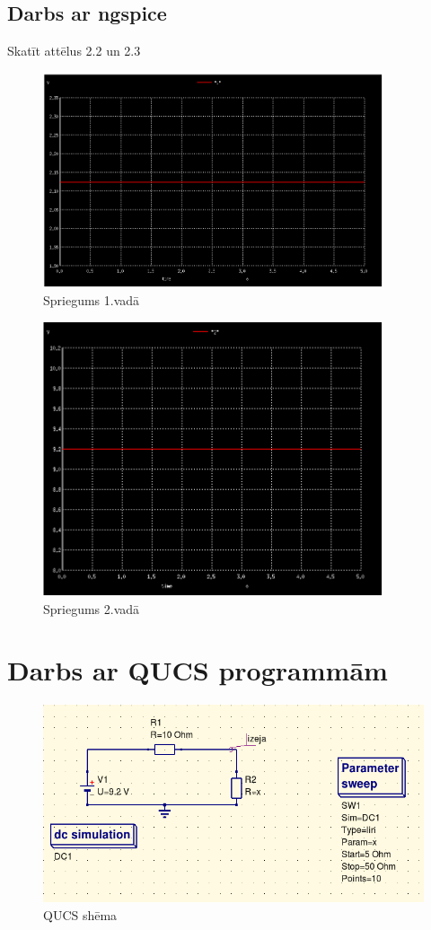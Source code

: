 \documentclass{report}
\begin{document}
\subsection{Darbs ar ngspice}
Skatīt attēlus 2.2 un 2.3 
\begin{figure}[!h]
    \centering
    \includegraphics[width=10cm]{011.png}
    \caption{Spriegums 1.vadā}
    \label{fig:2.1}
    \end{figure}
 \begin{figure}[t]
 \centering
    \includegraphics[width=10cm]{012.png}
    \caption{Spriegums 2.vadā}
    \label{fig:2.2}
\end{figure}
\newpage

\section{Darbs ar QUCS programmām}
\begin{figure}[!h]
    \centering
    \includegraphics[width=\textwidth, height=\textheight, keepaspectratio]{QUCS.png}
    \caption{QUCS shēma}
    \label{fig:2.3}
    \end{figure}
 
\end{document}
